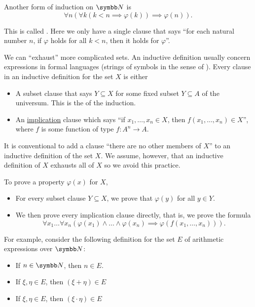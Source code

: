 \begin{remark}
  Another form of induction on \( \BN \) is
  \begin{equation*}
    \forall n (\forall k (k < n \implies \varphi(k)) \implies \varphi(n)).
  \end{equation*}

  This is called . Here we only have a single clause that says \enquote{for each natural number \( n \), if \( \varphi \) holds for all \( k < n \), then it holds for \( \varphi \)}.

  We can \enquote{exhaust} more complicated sets. An inductive definition usually concern expressions in formal languages (strings of symbols in the sense of ). Every clause in an inductive definition for the set \( X \) is either
  \begin{itemize}
    \item A subset clause that says \( Y \subseteq X \) for some fixed subset \( Y \subseteq A \) of the universum. This is the  of the induction.
    \item An \hyperref[def:material_implication]{implication} clause which says \enquote{if \( x_1, \ldots, x_n \in X \), then \( f(x_1, \ldots, x_n) \in X \)}, where \( f \) is some function of type \( f: A^n \to A \).
  \end{itemize}

  It is conventional to add a clause \enquote{there are no other members of \( X \)} to an inductive definition of the set \( X \). We assume, however, that an inductive definition of \( X \) exhausts all of \( X \) so we avoid this practice.

  To prove a property \( \varphi(x) \) for \( X \),
  \begin{itemize}
    \item For every subset clause \( Y \subseteq X \), we prove that \( \varphi(y) \) for all \( y \in Y \).
    \item We then prove every implication clause directly, that is, we prove the formula
          \begin{equation*}
            \forall x_1 \ldots \forall x_n (\varphi(x_1) \wedge \ldots \wedge \varphi(x_n) \implies \varphi(f(x_1, \ldots, x_n))).
          \end{equation*}
  \end{itemize}

  For example, consider the following definition for the set \( E \) of arithmetic expressions over \( \BN \):
  \begin{itemize}
    \item If \( n \in \BN \), then \( n \in E \).
    \item If \( \xi, \eta \in E \), then \( (\xi + \eta) \in E \)
    \item If \( \xi, \eta \in E \), then \( (\xi \cdot \eta) \in E \)
  \end{itemize}


\end{remark}

